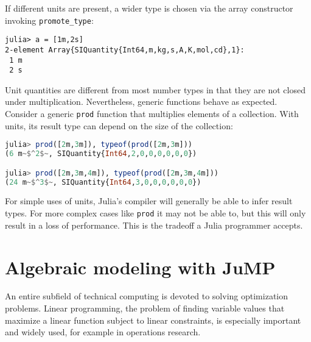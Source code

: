 \noindent
If different units are present, a wider type is chosen via the array
constructor invoking \texttt{promote\_type}:

\begin{singlespace}
\begin{verbatim}
julia> a = [1m,2s]
2-element Array{SIQuantity{Int64,m,kg,s,A,K,mol,cd},1}:
 1 m
 2 s
\end{verbatim}
\end{singlespace}

Unit quantities are different from most number types in that they are not
closed under multiplication.
Nevertheless, generic functions behave as expected.
Consider a generic \texttt{prod} function that multiplies elements of a
collection.
With units, its result type can depend on the size of the collection:

\begin{singlespace}
\begin{lstlisting}[language=julia]
julia> prod([2m,3m]), typeof(prod([2m,3m]))
(6 m~$^2$~, SIQuantity{Int64,2,0,0,0,0,0,0})

julia> prod([2m,3m,4m]), typeof(prod([2m,3m,4m]))
(24 m~$^3$~, SIQuantity{Int64,3,0,0,0,0,0,0})
\end{lstlisting}
\end{singlespace}

\noindent
For simple uses of units, Julia's compiler will generally be able to
infer result types.
For more complex cases like \texttt{prod} it may not be able to, but
this will only result in a loss of performance.
This is the tradeoff a Julia programmer accepts.





\section{Algebraic modeling with JuMP}
\label{sec:jump}

An entire subfield of technical computing is devoted to solving optimization
problems.
Linear programming, the problem of finding variable values that maximize a
linear function subject to linear constraints, is especially important and
widely used, for example in operations research.


